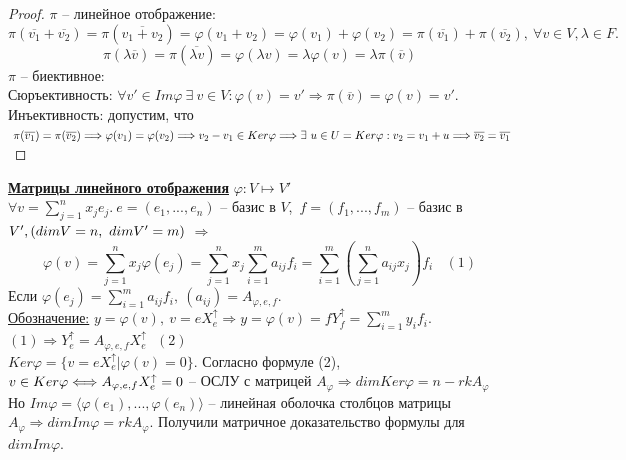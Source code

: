 \documentclass[a4paper, 12pt]{article}
\theoremstyle{definition}
\begin{document}
\begin{proof}
        $\pi$ -- линейное отображение:
        $$\pi(\overline{v_1} + \overline{v_2}) = 
        \pi(\overline{v_1 + v_2}) = \varphi(v_1 + v_2) = 
        \varphi(v_1) + \varphi(v_2) = \pi(\overline{v_1}) + 
        \pi(\overline{v_2}),\ \forall v \in V, \lambda \in F.$$
        $$\pi(\lambda \overline{v}) = \pi(\overline{\lambda v}) = 
        \varphi(\lambda v) = \lambda \varphi(v) = \lambda
        \pi(\overline{v})$$
        $\pi$ -- биективное:\\
        Сюръективность: $\forall v' \in Im\varphi\ \exists\ v
        \in V: \varphi(v) = v' \Longrightarrow \pi(\overline{v}) =
        \varphi(v) = v'$.\\
        Инъективность: допустим, что $\ \pi(\overline{v_1}) =
        \pi(\overline{v_2}) \Longrightarrow \varphi(v_1) =
        \varphi(v_2) \Longrightarrow\\ v_2 - v_1 \in
        Ker\varphi \Longrightarrow \exists\ u \in U = Ker
        \varphi: v_2 = v_1 + u \Longrightarrow \overline{v_2} =
        \overline{v_1}$

    \end{proof}
    \underline{\textbf{Матрицы линейного отображения}} $\varphi: V \mapsto V'$\\
    $\forall v = \sum\limits_{j=1}^nx_je_j.\ e = 
    (e_1,...,e_n)$ -- базис в $V$,\ 
    $f = (f_1,...,f_m)$ -- базис в $V',\\(dimV = n,\ dimV' = m)$
    $\Longrightarrow$ $$\varphi(v) = \sum\limits_{j=1}^nx_j
    \varphi(e_j) = \sum\limits_{j=1}^nx_j\sum\limits_{i=1}^ma_{ij}f_i = 
    \sum\limits_{i=1}^m(\sum\limits_{j=1}^na_{ij}x_j)f_i\ \ \ \ (1)$$
    Если $\varphi(e_j) = \sum\limits_{i=1}^ma_{ij}f_i,\ 
    (a_{ij}) = A_{\varphi,e,f}.$\\
    \underline{Обозначение:} $y = \varphi(v),\ v = eX_e^\uparrow \Longrightarrow
    y = \varphi(v) = fY_f^\uparrow = \sum\limits_{i=1}^my_if_i.$\\
    $(1) \Longrightarrow Y_e^\uparrow = A_{\varphi,e ,f}X_e^\uparrow\ \ \ (2)$\\
    $Ker\varphi = \{v = eX_e^\uparrow|\varphi(v) = 0\}$.
    Согласно формуле (2), $v \in Ker\varphi \Longleftrightarrow\\
    A_{\varphi,e,f}X_e^\uparrow = 0$ -- ОСЛУ с матрицей $A_\varphi
    \Longrightarrow dimKer\varphi = n - rkA_\varphi$\\
    Но $Im\varphi = \langle \varphi(e_1),...,\varphi(e_n) \rangle$ -- линейная
    оболочка столбцов матрицы $A_\varphi \Longrightarrow
    dimIm\varphi = rkA_\varphi$. Получили матричное доказательство
    формулы для $dimIm\varphi$.
\end{document}
